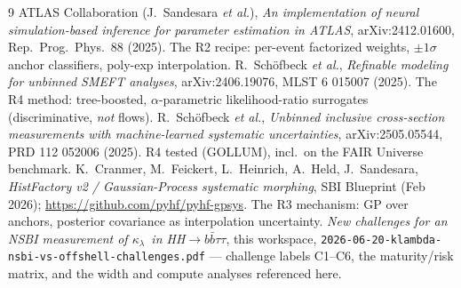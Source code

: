 \documentclass[11pt]{article}
\newcommand{\kl}{\ensuremath{\kappa_\lambda}}
\newcommand{\bbtt}{\ensuremath{b\bar b\tau\tau}}
\begin{document}
\begin{thebibliography}{9}\small
{} ATLAS Collaboration (J.~Sandesara \emph{et al.}), \emph{An implementation of neural
  simulation-based inference for parameter estimation in ATLAS}, arXiv:2412.01600, Rep.\ Prog.\ Phys.\ 88
  (2025). The R2 recipe: per-event factorized weights, $\pm1\sigma$ anchor classifiers, poly-exp interpolation.
 R.~Schöfbeck \emph{et al.}, \emph{Refinable modeling for unbinned SMEFT analyses},
  arXiv:2406.19076, MLST 6 015007 (2025). The R4 method: tree-boosted, $\alpha$-parametric likelihood-ratio
  surrogates (discriminative, \emph{not} flows).
 R.~Schöfbeck \emph{et al.}, \emph{Unbinned inclusive cross-section measurements with
  machine-learned systematic uncertainties}, arXiv:2505.05544, PRD 112 052006 (2025). R4 tested (GOLLUM), incl.\
  on the FAIR Universe benchmark.
 K.~Cranmer, M.~Feickert, L.~Heinrich, A.~Held, J.~Sandesara, \emph{HistFactory v2 /
  Gaussian-Process systematic morphing}, SBI Blueprint (Feb 2026); \url{https://github.com/pyhf/pyhf-gpsys}.
  The R3 mechanism: GP over anchors, posterior covariance as interpolation uncertainty.
\bibitem{chal} \emph{New challenges for an NSBI measurement of \kl\ in HH$\to$\bbtt}, this workspace,
  \texttt{2026-06-20-klambda-nsbi-vs-offshell-challenges.pdf} --- challenge labels C1--C6, the maturity/risk
  matrix, and the width and compute analyses referenced here.
\end{thebibliography}
\end{document}
